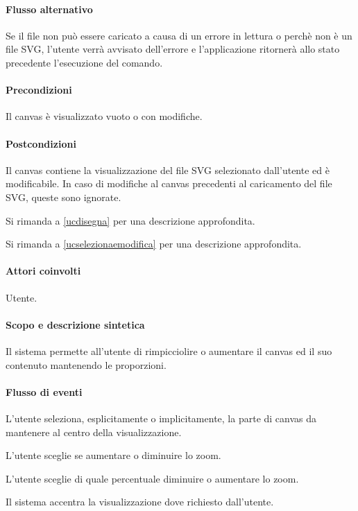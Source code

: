 \paragraph{Flusso alternativo}
Se il file non pu\`o essere caricato a causa di un errore in lettura o perch\`e non \`e un file SVG, l'utente verr\`a avvisato dell'errore e l'applicazione ritorner\`a allo stato precedente l'esecuzione del comando.
\paragraph{Precondizioni} Il canvas \`e visualizzato vuoto o con modifiche.
\paragraph{Postcondizioni} Il canvas contiene la visualizzazione del file SVG selezionato dall'utente ed \`e modificabile. In caso di modifiche al canvas precedenti al caricamento del file SVG, queste sono ignorate.

Si rimanda a \ref{ucdisegna} per una descrizione approfondita.

Si rimanda a \ref{ucselezionaemodifica} per una descrizione approfondita.

\paragraph{Attori coinvolti} Utente.
\paragraph{Scopo e descrizione sintetica} 
Il sistema permette all'utente di rimpicciolire o aumentare il canvas ed il suo contenuto mantenendo le proporzioni.
\paragraph{Flusso di eventi}
\begin{elenconumerato}[\textbf{}]{\subsubsecindent}
\item L'utente seleziona, esplicitamente o implicitamente, la parte di canvas da mantenere al centro della visualizzazione.
\item L'utente sceglie se aumentare o diminuire lo zoom.
\item L'utente sceglie di quale percentuale diminuire o aumentare lo zoom.
\item Il sistema accentra la visualizzazione dove richiesto dall'utente.
\end{elenconumerato}
